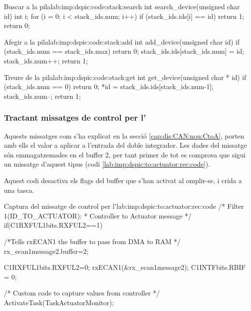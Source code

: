 \begin{code_c}{Buscar a la pila}{lab:imp:dspic:code:stack:search}
int search_device(unsigned char id)
{
	int i;
	for (i = 0; i < stack_ids.num; i++)
		if (stack_ids.ids[i] == id) return 1;
	return 0;
}
\end{code_c}

\begin{code_c}{Afegir a la pila}{lab:imp:dspic:code:stack:add}
int add_device(unsigned char id)
{
	if (stack_ids.num == stack_ids.max) return 0;
	stack_ids.ids[stack_ids.num] = id;
	stack_ids.num++;
	return 1;
}
\end{code_c}

\begin{code_c}{Treure de la pila}{lab:imp:dspic:code:stack:get}
int get_device(unsigned char * id)
{
	if (stack_ids.num == 0) return 0;
	*id = stack_ids.ids[stack_ids.num-1];
	stack_ids.num--;
	return 1;
}
\end{code_c}

\subsubsection{Tractant missatges de control per l'\Actuador}\label{lab:imp:dspic:ID_TO_ACTUATOR}

Aquests missatges com s'ha explicat en la secció \ref{cap:dis:CAN:nou:CtoA}, porten amb ells el valor a aplicar a l'entrada del doble integrador. Les dades del missatge són emmagatzemades en el buffer 2, per tant primer de tot es comprova que sigui un missatge d'aquest tipus (codi \ref{lab:imp:dspic:to:actuator:rec:code}).

Aquest codi desactiva els flags del buffer que s'han activat al omplir-se, i crida a una tasca.

\begin{code_c}{Captura del missatge de control per l'\Actuador}{lab:imp:dspic:to:actuator:rec:code}
/* Filter 1(ID_TO_ACTUATOR):
 * Controller to Actuator message */
if(C1RXFUL1bits.RXFUL2==1)
{
	/*Tells rxECAN1 the buffer to pass from DMA to RAM */
	rx_ecan1message2.buffer=2;

	C1RXFUL1bits.RXFUL2=0;
	rxECAN1(&rx_ecan1message2);
	C1INTFbits.RBIF = 0;

	/* Custom code to capture values from controller */
	ActivateTask(TaskActuatorMonitor);
}
\end{code_c}


